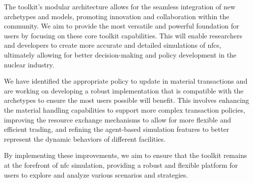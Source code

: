 The \cyclus toolkit's modular architecture allows for the seamless integration of new archetypes and models, promoting innovation and collaboration within the \cyclus community. We aim to provide the most versatile and powerful foundation for \cyclus users by focusing on these core toolkit capabilities. This will enable researchers and developers to create more accurate and detailed simulations of \glspl{nfc}, ultimately allowing for better decision-making and policy development in the nuclear industry.

We have identified the appropriate policy to update in material transactions and are working on developing a robust implementation that is compatible with the \cycamore archetypes to ensure the most users possible will benefit. This involves enhancing the material handling capabilities to support more complex transaction policies, improving the resource exchange mechanisms to allow for more flexible and efficient trading, and refining the agent-based simulation features to better represent the dynamic behaviors of different facilities.

By implementing these improvements, we aim to ensure that the \cyclus toolkit remains at the forefront of \gls{nfc} simulation, providing a robust and flexible platform for users to explore and analyze various scenarios and strategies.